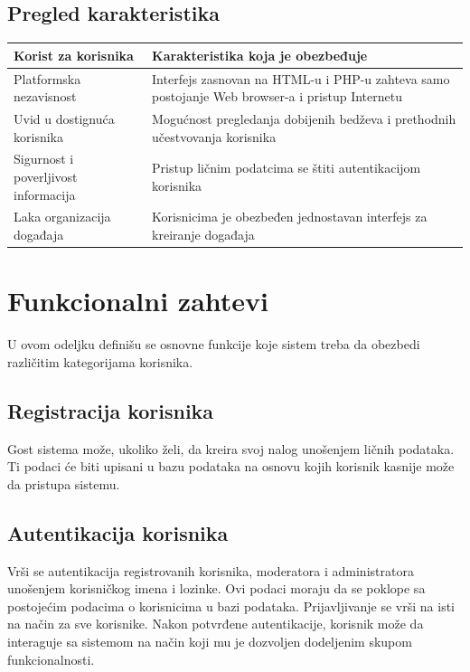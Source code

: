 \documentclass[11pt,a4paper]{article}
\begin{document}
\subsection{Pregled karakteristika}
\begin{center}
\begin{tabular}{| >{\centering\arraybackslash}m{4.7cm} | >{\centering\arraybackslash}m{7cm} |}
\hline
\rowcolor[HTML]{000000} 
{\color[HTML]{FFFFFF} Korist za korisnika } & {\color[HTML]{FFFFFF} Karakteristika koja je obezbeđuje } \\ \hline
Platformska nezavisnost & Interfejs zasnovan na HTML-u i PHP-u zahteva samo postojanje Web browser-a i pristup Internetu\\ \hline
Uvid u dostignuća korisnika & Mogućnost pregledanja dobijenih bedževa i prethodnih učestvovanja korisnika\\ \hline
Sigurnost i poverljivost informacija & Pristup ličnim podatcima se štiti autentikacijom korisnika \\ \hline
Laka organizacija događaja & Korisnicima je obezbeđen jednostavan interfejs za kreiranje događaja\\ \hline
\end{tabular}
\end{center}

\section{Funkcionalni zahtevi}
U ovom odeljku definišu se osnovne funkcije koje sistem treba da obezbedi različitim kategorijama korisnika.
\subsection{Registracija korisnika}
Gost sistema može, ukoliko želi, da kreira svoj nalog unošenjem ličnih podataka. Ti podaci će biti upisani u bazu podataka na osnovu kojih korisnik kasnije može da pristupa sistemu.
\subsection{Autentikacija korisnika}
Vrši se autentikacija registrovanih korisnika, moderatora i administratora unošenjem korisničkog imena i lozinke. Ovi podaci moraju da se poklope sa postojećim podacima o korisnicima u bazi podataka. Prijavljivanje se vrši na isti na način za sve korisnike. Nakon potvrđene autentikacije, korisnik može da interaguje sa sistemom na način koji mu je dozvoljen dodeljenim skupom funkcionalnosti.
\end{document}
